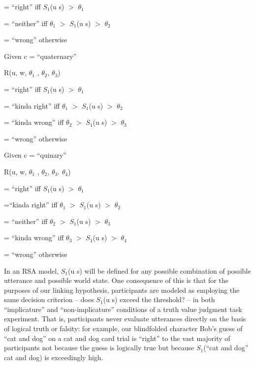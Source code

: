 \documentclass[man]{apa6}
\theoremstyle{definition}
\theoremstyle{definition}
\theoremstyle{definition}
\theoremstyle{remark}
\begin{document}
= \enquote{right} iff \(S_1\)(u \textbar{} s) \(>\) \(\theta_1\)

= \enquote{neither} iff \(\theta_1\) \(>\) \(S_1\)(u \textbar{} s) \(>\)
\(\theta_2\)

= \enquote{wrong} otherwise

Given c = \enquote{quaternary}

R(u, w, \(\theta_1\) , \(\theta_2\), \(\theta_3\))

= \enquote{right} iff \(S_1\)(u \textbar{} s) \(>\) \(\theta_1\)

= \enquote{kinda right} iff \(\theta_1\) \(>\) \(S_1\)(u \textbar{} s)
\(>\) \(\theta_2\)

= \enquote{kinda wrong} iff \(\theta_2\) \(>\) \(S_1\)(u \textbar{} s)
\(>\) \(\theta_3\)

= \enquote{wrong} otherwise

Given c = \enquote{quinary}

R(u, w, \(\theta_1\) , \(\theta_2\), \(\theta_3\). \(\theta_4\))

= \enquote{right} iff \(S_1\)(u \textbar{} s) \(>\) \(\theta_1\)

=\enquote{kinda right} iff \(\theta_1\) \(>\) \(S_1\)(u \textbar{} s)
\(>\) \(\theta_2\)

= \enquote{neither} iff \(\theta_2\) \(>\) \(S_1\)(u \textbar{} s) \(>\)
\(\theta_3\)

= \enquote{kinda wrong} iff \(\theta_3\) \(>\) \(S_1\)(u \textbar{} s)
\(>\) \(\theta_4\)

= \enquote{wrong} otherwise

In an RSA model, \(S_1\)(u \textbar{} s) will be defined for any
possible combination of possible utterance and possible world state. One
consequence of this is that for the purposes of our linking hypothesis,
participants are modeled as employing the same decision criterion --
does \(S_1\)(u \textbar{} s) exceed the threshold? -- in both
\enquote{implicature} and \enquote{non-implicature} conditions of a
truth value judgment task experiment. That is, participants never
evaluate utterances directly on the basis of logical truth or falsity:
for example, our blindfolded character Bob's guess of \enquote{cat and
dog} on a cat and dog card trial is \enquote{right} to the vast majority
of participants not because the guess is logically true but because
\(S_1\)(\enquote{cat and dog} \textbar{} cat and dog) is exceedingly
high.
\end{document}
